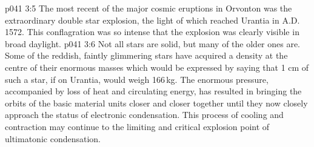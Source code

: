 \vs p041 3:5 \pc The most recent of the major cosmic eruptions in Orvonton was the extraordinary double star explosion, the light of which reached Urantia in A.D.\,1572. This conflagration was so intense that the explosion was clearly visible in broad daylight.
\vs p041 3:6 \pc Not all stars are solid, but many of the older ones are. Some of the reddish, faintly glimmering stars have acquired a density at the centre of their enormous masses which would be expressed by saying that 1 cm of such a star, if on Urantia, would weigh 166\,kg. The enormous pressure, accompanied by loss of heat and circulating energy, has resulted in bringing the orbits of the basic material units closer and closer together until they now closely approach the status of electronic condensation. This process of cooling and contraction may continue to the limiting and critical explosion point of ultimatonic condensation.
